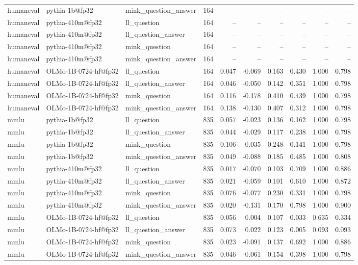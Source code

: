\begin{table}[t]
\begin{tabular}{lllrrrrrrr}
humaneval & pythia-1b@fp32 & mink\_question\_answer & 164 & -- & -- & -- & -- & -- & -- \\
humaneval & pythia-410m@fp32 & ll\_question & 164 & -- & -- & -- & -- & -- & -- \\
humaneval & pythia-410m@fp32 & ll\_question\_answer & 164 & -- & -- & -- & -- & -- & -- \\
humaneval & pythia-410m@fp32 & mink\_question & 164 & -- & -- & -- & -- & -- & -- \\
humaneval & pythia-410m@fp32 & mink\_question\_answer & 164 & -- & -- & -- & -- & -- & -- \\
humaneval & OLMo-1B-0724-hf@fp32 & ll\_question & 164 & 0.047 & -0.069 & 0.163 & 0.430 & 1.000 & 0.798 \\
humaneval & OLMo-1B-0724-hf@fp32 & ll\_question\_answer & 164 & 0.046 & -0.050 & 0.142 & 0.351 & 1.000 & 0.798 \\
humaneval & OLMo-1B-0724-hf@fp32 & mink\_question & 164 & 0.116 & -0.178 & 0.410 & 0.439 & 1.000 & 0.798 \\
humaneval & OLMo-1B-0724-hf@fp32 & mink\_question\_answer & 164 & 0.138 & -0.130 & 0.407 & 0.312 & 1.000 & 0.798 \\
\midrule
mmlu & pythia-1b@fp32 & ll\_question & 835 & 0.057 & -0.023 & 0.136 & 0.162 & 1.000 & 0.798 \\
mmlu & pythia-1b@fp32 & ll\_question\_answer & 835 & 0.044 & -0.029 & 0.117 & 0.238 & 1.000 & 0.798 \\
mmlu & pythia-1b@fp32 & mink\_question & 835 & 0.106 & -0.035 & 0.248 & 0.141 & 1.000 & 0.798 \\
mmlu & pythia-1b@fp32 & mink\_question\_answer & 835 & 0.049 & -0.088 & 0.185 & 0.485 & 1.000 & 0.808 \\
mmlu & pythia-410m@fp32 & ll\_question & 835 & 0.017 & -0.070 & 0.103 & 0.709 & 1.000 & 0.886 \\
mmlu & pythia-410m@fp32 & ll\_question\_answer & 835 & 0.021 & -0.059 & 0.101 & 0.610 & 1.000 & 0.872 \\
mmlu & pythia-410m@fp32 & mink\_question & 835 & 0.076 & -0.077 & 0.230 & 0.331 & 1.000 & 0.798 \\
mmlu & pythia-410m@fp32 & mink\_question\_answer & 835 & 0.020 & -0.131 & 0.170 & 0.798 & 1.000 & 0.900 \\
mmlu & OLMo-1B-0724-hf@fp32 & ll\_question & 835 & 0.056 & 0.004 & 0.107 & 0.033 & 0.635 & 0.334 \\
mmlu & OLMo-1B-0724-hf@fp32 & ll\_question\_answer & 835 & 0.073 & 0.022 & 0.123 & 0.005 & 0.093 & 0.093 \\
mmlu & OLMo-1B-0724-hf@fp32 & mink\_question & 835 & 0.023 & -0.091 & 0.137 & 0.692 & 1.000 & 0.886 \\
mmlu & OLMo-1B-0724-hf@fp32 & mink\_question\_answer & 835 & 0.046 & -0.061 & 0.154 & 0.398 & 1.000 & 0.798 \\
\bottomrule
\end{tabular}
\end{table}
